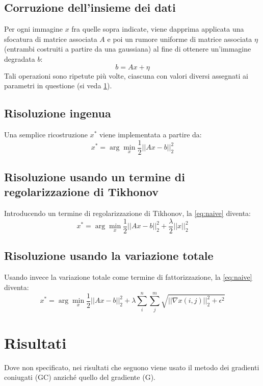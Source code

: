 \documentclass[a4paper]{article}
\begin{document}
\subsection{Corruzione dell'insieme dei dati}
Per ogni immagine $x$ fra quelle sopra indicate, viene dapprima applicata una
sfocatura di matrice associata $A$ e poi un rumore uniforme di matrice associata
$\eta$ (entrambi costruiti a partire da una gaussiana) al fine di ottenere
un'immagine degradata $b$:
\begin{equation}\label{eq:degradation}
  b = Ax + \eta
\end{equation}
Tali operazioni sono ripetute più volte, ciascuna con valori diversi assegnati
ai parametri in questione (si veda \ref{results}).

\subsection{Risoluzione ingenua}
Una semplice ricostruzione $x^*$ viene implementata a partire da:
\begin{equation}\label{eq:naive}
  x^* = \arg \min_{x} \frac{1}{2}||Ax - b||^2_2
\end{equation}

\subsection{Risoluzione usando un termine di regolarizzazione di Tikhonov}
Introducendo un termine di regolarizzazione di Tikhonov, la \ref{eq:naive}
diventa:
\begin{equation}
  x^* = \arg \min_{x} \frac{1}{2}||Ax - b||^2_2 + \frac{\lambda}{2}||x||^2_2
\end{equation}

\subsection{Risoluzione usando la variazione totale}
Usando invece la variazione totale come termine di fattorizzazione, la
\ref{eq:naive} diventa:
\begin{equation}
  x^* = \arg \min_{x} \frac{1}{2}||Ax - b||^2_2 +
  \lambda\sum_i^n\sum_j^m\sqrt{||\nabla x(i,j)||_2^2+\epsilon^2}
\end{equation}

\section{Risultati}\label{results}
Dove non specificato, nei risultati che seguono viene usato il metodo dei
gradienti coniugati (GC) anziché quello del gradiente (G). 
\end{document}
